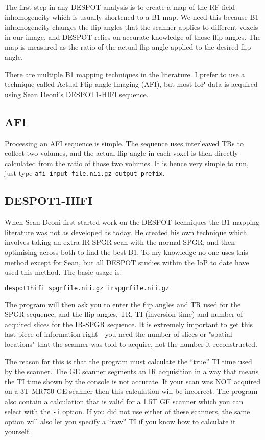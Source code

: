 \documentclass{report}
\begin{document}
The first step in any DESPOT analysis is to create a map of the RF field inhomogeneity which is usually shortened to a B1 map. We need this because B1 inhomogeneity changes the flip angles that the scanner applies to different voxels in our image, and DESPOT relies on accurate knowledge of those flip angles. The map is measured as the ratio of the actual flip angle applied to the desired flip angle.

There are multiple B1 mapping techniques in the literature. I prefer to use a technique called Actual Flip angle Imaging (AFI), but most IoP data is acquired using Sean Deoni's DESPOT1-HIFI sequence.

\subsection{AFI}

Processing an AFI sequence is simple. The sequence uses interleaved TRs to collect two volumes, and the actual flip angle in each voxel is then directly calculated from the ratio of those two volumes. It is hence very simple to run, just type \texttt{afi input\_file.nii.gz output\_prefix}.

\subsection{DESPOT1-HIFI}

When Sean Deoni first started work on the DESPOT techniques the B1 mapping literature was not as developed as today. He created his own technique which involves taking an extra IR-SPGR scan with the normal SPGR, and then optimising across both to find the best B1. To my knowledge no-one uses this method except for Sean, but all DESPOT studies within the IoP to date have used this method. The basic usage is:

\begin{lstlisting}[language=sh]
despot1hifi spgrfile.nii.gz irspgrfile.nii.gz
\end{lstlisting}

The program will then ask you to enter the flip angles and TR used for the SPGR sequence, and the flip angles, TR, TI (inversion time) and number of acquired slices for the IR-SPGR sequence. It is extremely important to get this last piece of information right - you need the number of slices or "spatial locations" that the scanner was told to acquire, not the number it reconstructed.

The reason for this is that the program must calculate the ``true'' TI time used by the scanner. The GE scanner segments an IR acquisition in a way that means the TI time shown by the console is not accurate. If your scan was NOT acquired on a 3T MR750 GE scanner then this calculation will be incorrect. The program also contain a calculation that is valid for a 1.5T GE scanner which you can select with the \texttt{-i} option. If you did not use either of these scanners, the same option will also let you specify a ``raw'' TI if you know how to calculate it yourself.
\end{document}
